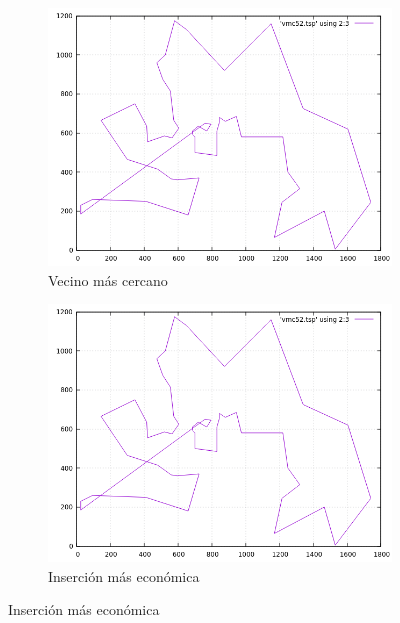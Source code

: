 \documentclass[12pt,spanish]{article}
\begin{document}
\begin{figure}[H]
\centering
\begin{subfigure}[b]{0.36\textwidth}
\includegraphics[width=\textwidth]{berlin52_vmc.png}
\caption{Vecino más cercano}
\end{subfigure}
\quad
\begin{subfigure}[b]{0.36\textwidth}
\includegraphics[width=\textwidth]{berlin52_vmc.png}
\caption{Inserción más económica}
\end{subfigure}

\vspace{1cm}


\end{figure}
\end{document}
